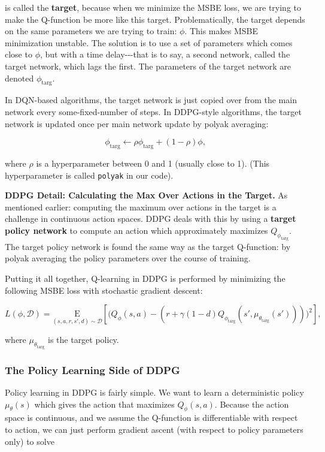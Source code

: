 is called the \textbf{target}, because when we minimize the MSBE loss,
we are trying to make the Q-function be more like this target.
Problematically, the target depends on the same parameters we are trying
to train: \(\phi\). This makes MSBE minimization unstable. The solution
is to use a set of parameters which comes close to \(\phi\), but with a
time delay-\/-\/-that is to say, a second network, called the target
network, which lags the first. The parameters of the target network are
denoted \(\phi_{\text{targ}}\).

In DQN-based algorithms, the target network is just copied over from the
main network every some-fixed-number of steps. In DDPG-style algorithms,
the target network is updated once per main network update by polyak
averaging:

\[\phi_{\text{targ}} \leftarrow \rho \phi_{\text{targ}} + (1 - \rho) \phi,\]

where \(\rho\) is a hyperparameter between 0 and 1 (usually close to 1).
(This hyperparameter is called \texttt{polyak} in our code).

\textbf{DDPG Detail: Calculating the Max Over Actions in the Target.} As
mentioned earlier: computing the maximum over actions in the target is a
challenge in continuous action spaces. DDPG deals with this by using a
\textbf{target policy network} to compute an action which approximately
maximizes \(Q_{\phi_{\text{targ}}}\). The target policy network is found
the same way as the target Q-function: by polyak averaging the policy
parameters over the course of training.

Putting it all together, Q-learning in DDPG is performed by minimizing
the following MSBE loss with stochastic gradient descent:

\[L(\phi, {\mathcal D}) = \underset{(s,a,r,s',d) \sim {\mathcal D}}{{\mathrm E}}\left[
    \Bigg( Q_{\phi}(s,a) - \left(r + \gamma (1 - d) Q_{\phi_{\text{targ}}}(s', \mu_{\theta_{\text{targ}}}(s')) \right) \Bigg)^2
    \right],\]

where \(\mu_{\theta_{\text{targ}}}\) is the target policy.

\hypertarget{the-policy-learning-side-of-ddpg}{%
\subsubsection{The Policy Learning Side of
DDPG}\label{the-policy-learning-side-of-ddpg}}

Policy learning in DDPG is fairly simple. We want to learn a
deterministic policy \(\mu_{\theta}(s)\) which gives the action that
maximizes \(Q_{\phi}(s,a)\). Because the action space is continuous, and
we assume the Q-function is differentiable with respect to action, we
can just perform gradient ascent (with respect to policy parameters
only) to solve

